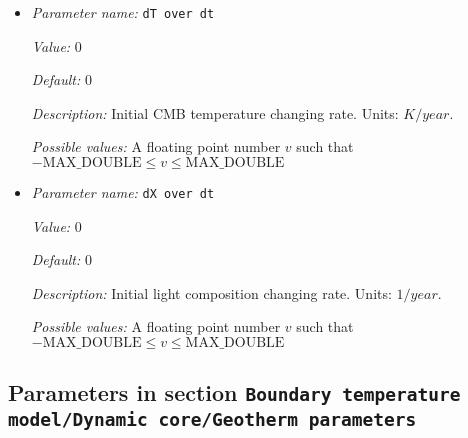 \begin{itemize}
{\it Value:} 0


{\it Default:} 0


{\it Description:} Initial inner core radius changing rate. Units: $km/year$.


{\it Possible values:} A floating point number $v$ such that $-\text{MAX\_DOUBLE} \leq v \leq \text{MAX\_DOUBLE}$
\item {\it Parameter name:} {\tt dT over dt}
\label{parameters:Boundary temperature model/Dynamic core/dT over dt}


{\it Value:} 0


{\it Default:} 0


{\it Description:} Initial CMB temperature changing rate. Units: $K/year$.


{\it Possible values:} A floating point number $v$ such that $-\text{MAX\_DOUBLE} \leq v \leq \text{MAX\_DOUBLE}$
\item {\it Parameter name:} {\tt dX over dt}
\label{parameters:Boundary temperature model/Dynamic core/dX over dt}


{\it Value:} 0


{\it Default:} 0


{\it Description:} Initial light composition changing rate. Units: $1/year$.


{\it Possible values:} A floating point number $v$ such that $-\text{MAX\_DOUBLE} \leq v \leq \text{MAX\_DOUBLE}$
\end{itemize}



\subsection{Parameters in section \tt Boundary temperature model/Dynamic core/Geotherm parameters}
\label{parameters:Boundary_20temperature_20model/Dynamic_20core/Geotherm_20parameters}

